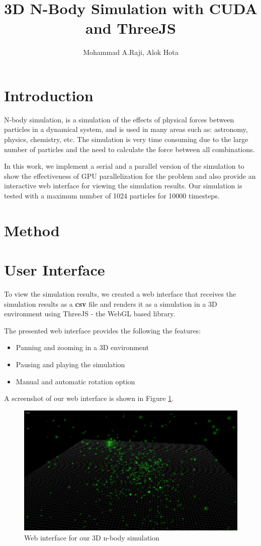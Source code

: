 \documentclass[10pt,a4paper]{article}
\author{Mohammad A.Raji, Alok Hota}
\title{3D N-Body Simulation with CUDA and ThreeJS}
\begin{document}
	\maketitle
	
	\section{Introduction}
	N-body simulation, is a simulation of the effects of physical forces between particles in a dynamical system, and is used in many areas such as: astronomy, physics, chemistry, etc. The simulation is very time consuming due to the large number of particles and the need to calculate the force between all combinations. 
	
	In this work, we implement a serial and a parallel version of the simulation to show the effectiveness of GPU parallelization for the problem and also provide an interactive web interface for viewing the simulation results. Our simulation is tested with a maximum number of 1024 particles for 10000 timesteps. 
	\section{Method}
	
	\section{User Interface}
	To view the simulation results, we created a web interface that receives the simulation results as a \textbf{csv} file and renders it as a simulation in a 3D environment using ThreeJS - the WebGL based library.
	
	The presented web interface provides the following the features: 
	\begin{itemize}
		\item Panning and zooming in a 3D environment
		\item Pausing and playing the simulation 
		\item Manual and automatic rotation option
	\end{itemize}
	
	A screenshot of our web interface is shown in Figure \ref{scr}.
	\begin{figure}
		\centering
		\includegraphics[scale=0.3]{scr.png}
		\caption{Web interface for our 3D n-body simulation}
		\label{scr}
	\end{figure}
	
\end{document}

